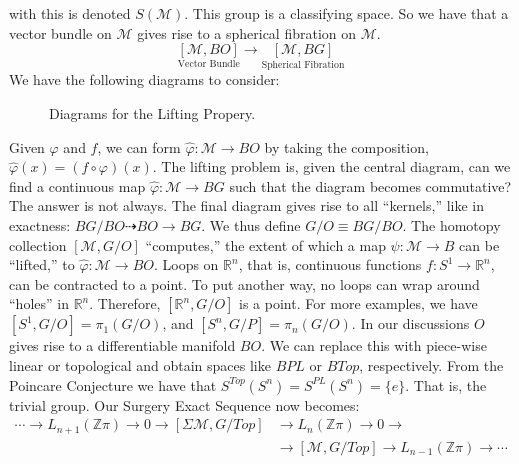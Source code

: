 \documentclass[crop=false,class=book,oneside]{standalone}                      %
\begin{document}
        with this is denoted $S(\mathcal{M})$. This group
        is a classifying space. So we have that a vector
        bundle on $\mathcal{M}$ gives rise to a spherical
        fibration on $\mathcal{M}$.
        \begin{equation*}
            \underset{\textrm{Vector Bundle}}{[\mathcal{M},BO]}
            \longrightarrow
            \underset{\textrm{Spherical Fibration}}{[\mathcal{M},BG]}
        \end{equation*}
        We have the following diagrams to consider:
        \begin{figure}
            \centering
            \captionsetup{type=figure}
            \caption{Diagrams for the Lifting Propery.}
            \label{fig:Surgery_Theory_Lifting_Property_Diagram}
        \end{figure}
        Given $\varphi$ and $f$, we can form
        $\hat{\varphi}:\mathcal{M}\rightarrow{BO}$ by taking
        the composition, $\hat{\varphi}(x)=(f\circ\varphi)(x)$.
        The lifting problem is, given the central diagram,
        can we find a continuous map
        $\hat{\varphi}:\mathcal{M}\rightarrow{BG}$ such that
        the diagram becomes commutative? The answer is not always.
        The final diagram gives rise to all ``kernels,'' like
        in exactness: $BG/BO\dashrightarrow{BO}\rightarrow{BG}$.
        We thus define $G/O\equiv{BG/BO}$. The homotopy collection
        $[\mathcal{M},G/O]$ ``computes,'' the extent of which a map
        $\psi:\mathcal{M}\rightarrow{B}$ can be ``lifted,'' to
        $\hat{\varphi}:\mathcal{M}\rightarrow{BO}$.
        Loops on $\mathbb{R}^{n}$, that is, continuous functions
        $f:S^{1}\rightarrow\mathbb{R}^{n}$, can be
        contracted to a point. To put another way, no loops
        can wrap around ``holes'' in $\mathbb{R}^{n}$.
        Therefore, $[\mathbb{R}^{n},G/O]$ is a point. For
        more examples, we have
        $[S^{1},G/O]=\pi_{1}(G/O)$, and
        $[S^{n},G/P]=\pi_{n}(G/O)$. In our discussions
        $O$ gives rise to a differentiable manifold $BO$.
        We can replace this with piece-wise linear or
        topological and obtain spaces like
        $BPL$ or $BTop$, respectively.
        From the Poincare Conjecture we have that
        $S^{Top}(S^{n})=S^{PL}(S^{n})=\{e\}$. That is,
        the trivial group. Our Surgery Exact Sequence now
        becomes:
        \begin{align*}
            \cdots\rightarrow{L}_{n+1}(\mathbb{Z}\pi)
            \rightarrow0\rightarrow
            [\Sigma\mathcal{M},G/Top]&\rightarrow
            L_{n}(\mathbb{Z}\pi)\rightarrow
            0\rightarrow\\
            &\rightarrow[\mathcal{M},G/Top]\rightarrow
            L_{n-1}(\mathbb{Z}\pi)\rightarrow\cdots
        \end{align*}
\end{document}
